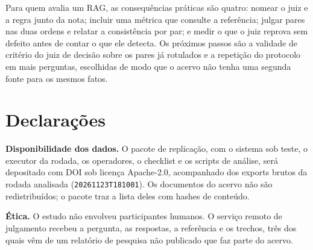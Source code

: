 \documentclass[12pt]{article}
\newcommand{\code}[1]{\texttt{\small #1}}
\begin{document}
Para quem avalia um RAG, as consequências práticas são quatro: nomear o juiz e a regra junto
da nota; incluir uma métrica que consulte a referência; julgar pares nas duas ordens e relatar
a consistência por par; e medir o que o juiz reprova sem defeito antes de contar o que ele
detecta. Os próximos passos são a validade de critério do juiz de decisão sobre os pares já
rotulados e a repetição do protocolo em mais perguntas, escolhidas de modo que o acervo não
tenha uma segunda fonte para os mesmos fatos.

\section*{Declarações}

\noindent\textbf{Disponibilidade dos dados.} O pacote de replicação, com o sistema sob teste,
o executor da rodada, os operadores, o checklist e os scripts de análise, será depositado com
DOI sob licença Apache-2.0, acompanhado dos exports brutos da rodada analisada
(\code{20261123T181001}). Os documentos do acervo não são redistribuídos; o pacote traz a lista
deles com hashes de conteúdo.

\medskip
\noindent\textbf{Ética.} O estudo não envolveu participantes humanos. O serviço remoto de
julgamento recebeu a pergunta, as respostas, a referência e os trechos, três dos quais vêm de
um relatório de pesquisa não publicado que faz parte do acervo.

%



\end{document}
